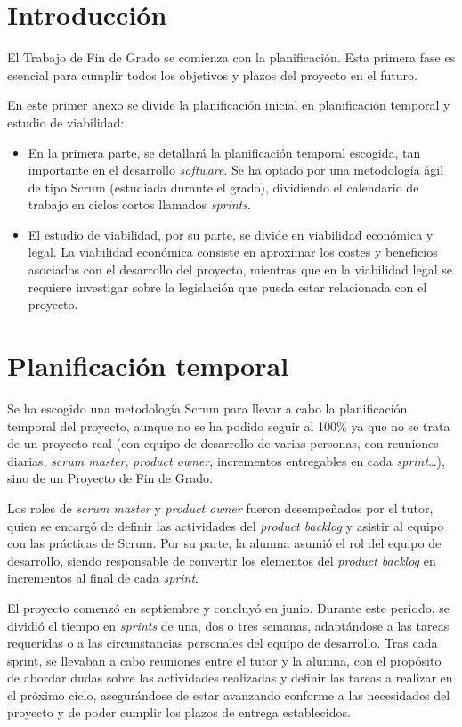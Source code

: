 
\section{Introducción}
El Trabajo de Fin de Grado se comienza con la planificación. Esta primera fase es esencial para cumplir todos los objetivos y plazos del proyecto en el futuro.

En este primer anexo se divide la planificación inicial en planificación temporal y estudio de viabilidad:
\begin{itemize}
    \item En la primera parte, se detallará la planificación temporal escogida, tan importante en el desarrollo \textit{software}. Se ha optado por una metodología ágil de tipo Scrum (estudiada durante el grado), dividiendo el calendario de trabajo en ciclos cortos llamados \textit{sprints}.
    \item El estudio de viabilidad, por su parte, se divide en viabilidad económica y legal. La viabilidad económica consiste en aproximar los costes y beneficios asociados con el desarrollo del proyecto, mientras que en la viabilidad legal se requiere investigar sobre la legislación que pueda estar relacionada con el proyecto.
\end{itemize}


\section{Planificación temporal}
Se ha escogido una metodología Scrum para llevar a cabo la planificación temporal del proyecto, aunque no se ha podido seguir al 100\% ya que no se trata de un proyecto real (con equipo de desarrollo de varias personas, con reuniones diarias, \textit{scrum master}, \textit{product owner}, incrementos entregables en cada \textit{sprint}\ldots), sino de un Proyecto de Fin de Grado.

Los roles de \textit{scrum master} y \textit{product owner} fueron desempeñados por el tutor, quien se encargó de definir las actividades del \textit{product backlog} y asistir al equipo con las prácticas de Scrum. Por su parte, la alumna asumió el rol del equipo de desarrollo, siendo responsable de convertir los elementos del \textit{product backlog} en incrementos al final de cada \textit{sprint}.

El proyecto comenzó en septiembre y concluyó en junio. Durante este periodo, se dividió el tiempo en \textit{sprints} de una, dos o tres semanas, adaptándose a las tareas requeridas o a las circunstancias personales del equipo de desarrollo. Tras cada sprint, se llevaban a cabo reuniones entre el tutor y la alumna, con el propósito de abordar dudas sobre las actividades realizadas y definir las tareas a realizar en el próximo ciclo, asegurándose de estar avanzando conforme a las necesidades del proyecto y de poder cumplir los plazos de entrega establecidos.

